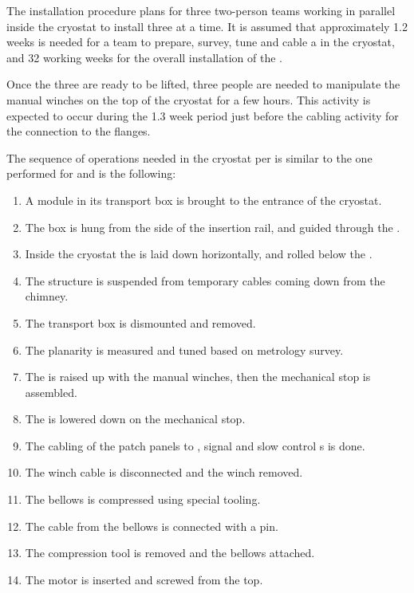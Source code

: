 The installation procedure  plans for three two-person teams working in parallel inside the cryostat to 
install three  at a time. It is assumed that %
approximately \num{1.2} weeks is needed for a team to prepare, survey, tune and cable a  in the  cryostat, and \num{32} working weeks for the overall installation of the \dptotcrp {}.

Once the three  are ready to be lifted, three people are needed to manipulate the manual winches on the top of the cryostat for a few hours. This activity is expected to occur during the \num{1.3} week period just before the cabling activity for the connection to the flanges.

The sequence of operations needed in the cryostat per  is similar to the one performed for   and is the following: 
\begin{enumerate}
\item A  module in its transport box is brought to the entrance of the cryostat.
\item The box is hung from the side of the insertion rail, and guided through the .
\item  Inside the cryostat the  is laid down horizontally, and rolled below the .
\item The structure is suspended from temporary cables coming down from the chimney.
\item The transport box is dismounted and removed.
\item The  planarity is measured and tuned based on metrology survey.
\item The  is raised up with the manual winches, then the mechanical stop is assembled.
\item The  is lowered down  on the mechanical stop.
\item The cabling of the  patch panels to , signal and slow control \fdth{}s is done.
\item The winch cable is disconnected  and the winch removed.
\item The bellows is compressed using special tooling.
\item The cable from the bellows is connected with a pin.
\item The compression tool is removed and the bellows attached.
\item The motor is inserted and screwed from the top.
\end{enumerate}
 

